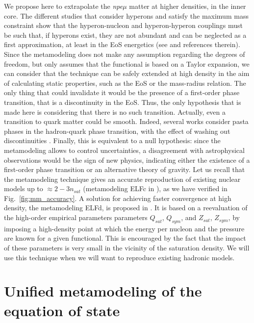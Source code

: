 We propose here to extrapolate the \textit{npe$\mu$} matter at higher
densities, in the inner core. {The different studies that consider 
  hyperons and satisfy the maximum mass 
constraint show that the hyperon-nucleon and hyperon-hyperon couplings must be 
such that, if hyperons exist, they are not abundant and can be neglected as a 
first approximation, at least in the EoS energetics (see \cite{Oertel2017} and
references therein). Since the metamodeling does not make any assumption 
regarding the degrees of freedom, but only assumes that the functional is based 
on a Taylor expansion, we can consider that the technique can be safely extended 
at high density in the aim of calculating static properties, such as the EoS or 
the mass-radius relation. The only thing that could invalidate it would be the 
presence of a first-order phase transition, that is a discontinuity 
in the EoS. Thus, the only hypothesis that is made here is considering that 
there is no such transition. Actually, even a transition to quark matter could 
be smooth. Indeed, several works consider pasta phases in the hadron-quark 
phase transition, with the effect of washing out
discontinuities \cite{Maruyama2009,Yasutake2009,Yasutake2011,Yasutake2014}. 
Finally, this is equivalent to a null hypothesis: since the metamodeling 
allows to control uncertainties, a disagreement with astrophysical 
observations would be the sign of new physics, indicating either the existence
of a first-order phase transition or an alternative theory of gravity.} Let us 
recall that the metamodeling technique gives an accurate reproduction of
existing nuclear models up to $\approx 2-3 n_{sat}$ (metamodeling ELFc 
in \cite{Margueron2018a}), as we have verified in Fig.~\ref{fig:mm_accuracy}.
A solution for achieving faster convergence at high density, the 
metamodeling ELFd, is proposed in \cite{Margueron2018a}. It is based on a
reevaluation of the high-order empirical parameters parameters $Q_{sat}$,
$Q_{sym}$, and $Z_{sat}$, $Z_{sym}$, by imposing a high-density point at which
the energy per nucleon and the pressure are known for a given functional. This
is encouraged by the fact that the impact of these parameters is very small in
the vicinity of the saturation density. We will use this technique when we will
want to reproduce existing hadronic models.


\section{Unified metamodeling of the equation of state}\label{sec:mmeos}

